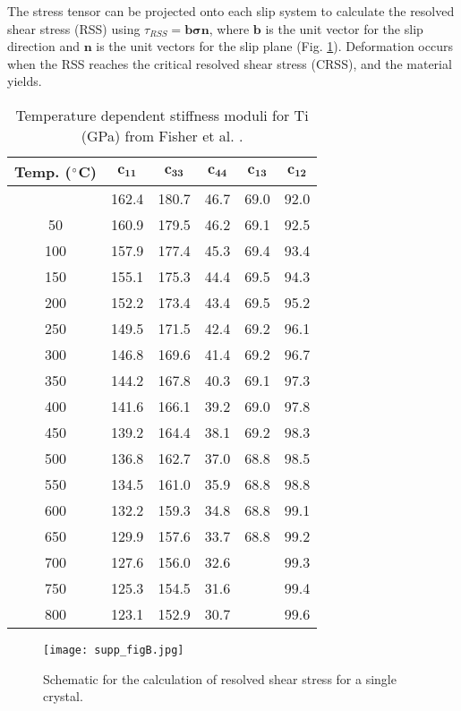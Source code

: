\documentclass[3p]{elsarticle}
\begin{document}
\begin{appendices}
	The stress tensor can be projected onto each slip system to calculate the resolved shear stress (RSS) using $\tau_{RSS}=\boldsymbol{b \sigma n}$, where $\boldsymbol{b}$ is the unit vector for the slip direction and $\boldsymbol{n}$ is the unit vectors for the slip plane (Fig. \ref{fig:RSS_calc}). Deformation occurs when the RSS reaches the critical resolved shear stress (CRSS), and the material yields.


\begin{table}[h]
	\centering
	\begin{tabular}{c|c|c|c|c|c}
		\textbf{Temp. ($\degree$C)} & $\mathbf{c_{11}}$ & $\mathbf{c_{33}}$  & $\mathbf{c_{44}}$ & $\mathbf{c_{13}}$ & $\mathbf{c_{12}}$ \\ \hline
		\rowcolor{Gray}
		\hline
		25 & 162.4 & 180.7 & 46.7 & 69.0 & 92.0 \\ 
		\rowcolor{White}
		50 & 160.9 &  179.5 & 46.2 & 69.1 & 92.5 \\ 
		\rowcolor{Gray}
		100 &  157.9 & 177.4 & 45.3 & 69.4 & 93.4 \\ 
		\rowcolor{White}
		150 & 155.1 & 175.3 & 44.4 & 69.5 & 94.3 \\ 
		\rowcolor{Gray}
		200 & 152.2 & 173.4 & 43.4 & 69.5 & 95.2 \\ 
		\rowcolor{White}
		250 & 149.5 & 171.5 & 42.4 & 69.2 & 96.1 \\ 
		\rowcolor{Gray}
		300 & 146.8 & 169.6 & 41.4 & 69.2 & 96.7 \\ 
		\rowcolor{White}
		350 & 144.2 & 167.8 & 40.3 & 69.1 & 97.3 \\ 
		\rowcolor{Gray}
		400 & 141.6 & 166.1 & 39.2 & 69.0 & 97.8 \\ 
		\rowcolor{White}
		450 & 139.2 & 164.4 & 38.1 & 69.2 & 98.3 \\ 
		\rowcolor{Gray}
		500 & 136.8 & 162.7 & 37.0 & 68.8 & 98.5 \\ 
		\rowcolor{White}
		550 & 134.5 & 161.0 & 35.9 & 68.8 & 98.8 \\ 
		\rowcolor{Gray}
		600 & 132.2 & 159.3 & 34.8 & 68.8 & 99.1 \\ 
		\rowcolor{White}
		650 & 129.9 & 157.6 & 33.7 & 68.8 & 99.2 \\ 
		\rowcolor{Gray}
		700 & 127.6 & 156.0 & 32.6 &  & 99.3 \\ 
		\rowcolor{White}
		750 & 125.3 & 154.5 & 31.6 &  & 99.4 \\ 
		\rowcolor{Gray}
		800 & 123.1 & 152.9 & 30.7 &  & 99.6 \\ 
		
	\end{tabular}
	\caption{Temperature dependent stif{}fness moduli for Ti (GPa) from Fisher et al. \cite{Fisher1964}.}
	\label{tab:Ti_stif{}fness}
\end{table}


	\begin{figure}[h]
		\centering
		\texttt{[image: supp\_figB.jpg]}
		\caption{Schematic for the calculation of resolved shear stress for a single crystal. }
		\label{fig:RSS_calc}
	\end{figure}
	

\newpage


\end{appendices}
\newpage
\clearpage



\end{document}
